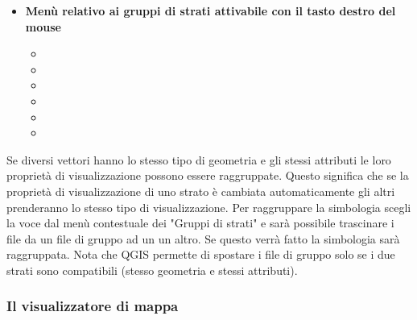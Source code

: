\begin{itemize}
\item \textbf{Menù relativo ai gruppi di strati attivabile con il tasto destro del mouse} 
\begin{itemize}
\item {}
\item {}
\item {}
\item {}
\item {}
\item {}
\end{itemize}

\end{itemize}

Se diversi vettori hanno lo stesso tipo di geometria e gli stessi attributi le loro proprietà di visualizzazione
possono essere raggruppate. Questo significa che se la proprietà di visualizzazione di uno
strato è cambiata automaticamente gli altri prenderanno lo stesso tipo di visualizzazione. Per raggruppare
la simbologia scegli la voce  dal menù contestuale dei "Gruppi di strati" e sarà
possibile trascinare i file da un file di gruppo ad un un altro. Se questo verrà fatto la simbologia sarà
raggruppata. Nota che QGIS permette di spostare i file di gruppo solo se i due strati sono compatibili
(stesso geometria e stessi attributi).

%

\subsubsection{Il visualizzatore di mappa}\label{label_mapview}

